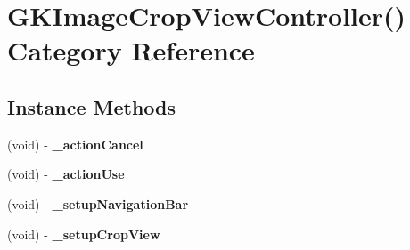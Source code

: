 \hypertarget{category_g_k_image_crop_view_controller_07_08}{}\section{G\+K\+Image\+Crop\+View\+Controller() Category Reference}
\label{category_g_k_image_crop_view_controller_07_08}
\subsection*{Instance Methods}
\begin{DoxyCompactItemize}
\item 
\hypertarget{category_g_k_image_crop_view_controller_07_08_a8535f04511f4ccfe0a93ec30e806930a}{}(void) -\/ {\bfseries \+\_\+action\+Cancel}\label{category_g_k_image_crop_view_controller_07_08_a8535f04511f4ccfe0a93ec30e806930a}

\item 
\hypertarget{category_g_k_image_crop_view_controller_07_08_a58e249618cb0f4e4eeb342e699f1c3c8}{}(void) -\/ {\bfseries \+\_\+action\+Use}\label{category_g_k_image_crop_view_controller_07_08_a58e249618cb0f4e4eeb342e699f1c3c8}

\item 
\hypertarget{category_g_k_image_crop_view_controller_07_08_afb7636dee1aef304a8c7b5cb7d26f894}{}(void) -\/ {\bfseries \+\_\+setup\+Navigation\+Bar}\label{category_g_k_image_crop_view_controller_07_08_afb7636dee1aef304a8c7b5cb7d26f894}

\item 
\hypertarget{category_g_k_image_crop_view_controller_07_08_a0fa9aca098a35cfaf69af790560a8c29}{}(void) -\/ {\bfseries \+\_\+setup\+Crop\+View}\label{category_g_k_image_crop_view_controller_07_08_a0fa9aca098a35cfaf69af790560a8c29}

\end{DoxyCompactItemize}
